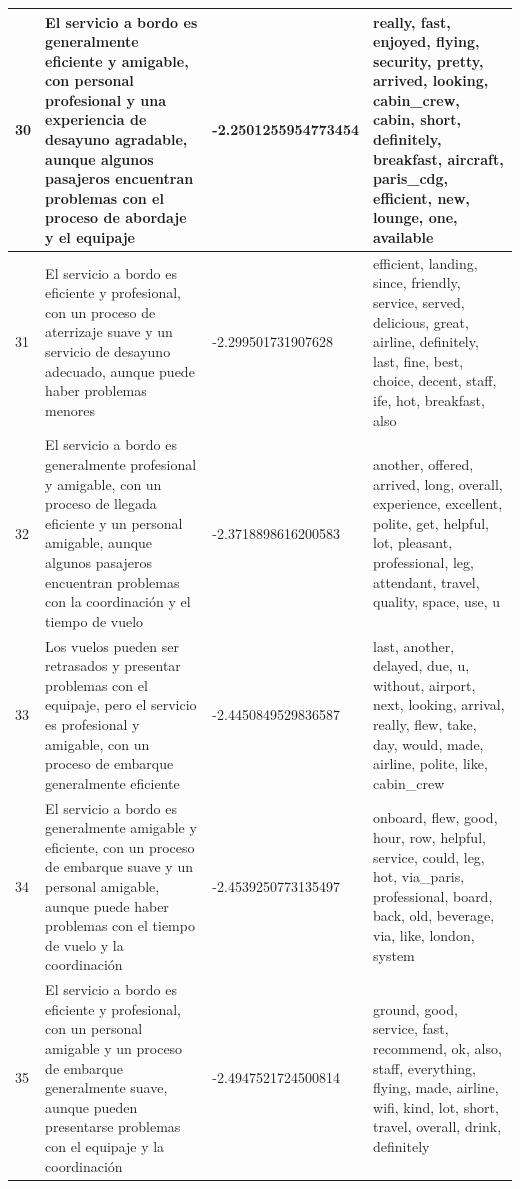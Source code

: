 \documentclass{report}
\begin{document}
{{\begin{longtable}{|p{1cm}|p{4cm}|p{4cm}|p{6cm}|}
                    \hline
                    30 & El servicio a bordo es generalmente eficiente y amigable, con personal profesional y una experiencia de desayuno agradable, aunque algunos pasajeros encuentran problemas con el proceso de abordaje y el equipaje & -2.2501255954773454 & really, fast, enjoyed, flying, security, pretty, arrived, looking, cabin\_crew, cabin, short, definitely, breakfast, aircraft, paris\_cdg, efficient, new, lounge, one, available \\
                    \hline
                    31 & El servicio a bordo es eficiente y profesional, con un proceso de aterrizaje suave y un servicio de desayuno adecuado, aunque puede haber problemas menores & -2.299501731907628 & efficient, landing, since, friendly, service, served, delicious, great, airline, definitely, last, fine, best, choice, decent, staff, ife, hot, breakfast, also \\
                    \hline
                    32 & El servicio a bordo es generalmente profesional y amigable, con un proceso de llegada eficiente y un personal amigable, aunque algunos pasajeros encuentran problemas con la coordinación y el tiempo de vuelo & -2.3718898616200583 & another, offered, arrived, long, overall, experience, excellent, polite, get, helpful, lot, pleasant, professional, leg, attendant, travel, quality, space, use, u \\
                    \hline
                    33 & Los vuelos pueden ser retrasados y presentar problemas con el equipaje, pero el servicio es profesional y amigable, con un proceso de embarque generalmente eficiente & -2.4450849529836587 & last, another, delayed, due, u, without, airport, next, looking, arrival, really, flew, take, day, would, made, airline, polite, like, cabin\_crew \\
                    \hline
                    34 & El servicio a bordo es generalmente amigable y eficiente, con un proceso de embarque suave y un personal amigable, aunque puede haber problemas con el tiempo de vuelo y la coordinación & -2.4539250773135497 & onboard, flew, good, hour, row, helpful, service, could, leg, hot, via\_paris, professional, board, back, old, beverage, via, like, london, system \\
                    \hline
                    35 & El servicio a bordo es eficiente y profesional, con un personal amigable y un proceso de embarque generalmente suave, aunque pueden presentarse problemas con el equipaje y la coordinación & -2.4947521724500814 & ground, good, service, fast, recommend, ok, also, staff, everything, flying, made, airline, wifi, kind, lot, short, travel, overall, drink, definitely \\

\end{longtable}}}
\end{document}
